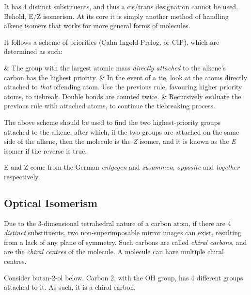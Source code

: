 
			It has 4 distinct substituents, and thus a cis/trans designation cannot be used. Behold, E/Z isomerism. At its core it
			is simply another method of handling alkene isomers that works for more general forms of molecules.

			It follows a scheme of priorities (Cahn-Ingold-Prelog, or CIP), which are determined as such:
			\begin{romanlist}
				& The group with the largest atomic mass \textit{directly attached} to the alkene's carbon has the highest priority.
				& In the event of a tie, look at the atoms directly attached to \textit{that} offending atom. Use the previous
				  rule, favouring higher priority atoms, to tiebreak. Double bonds are counted twice.
				& Recursively evaluate the previous rule with attached atoms, to continue the tiebreaking process.
			\end{romanlist}

			The above scheme should be used to find the two highest-priority groups attached to the alkene, after which, if the two
			groups are attached on the same side of the alkene, then the molecule is the \textit{Z} isomer, and it is known as the
			\textit{E} isomer if the reverse is true.

			E and Z come from the German \textit{entgegen} and \textit{zusammen}, \textit{opposite} and \textit{together}
			respectively.



		\pagebreak
		\subsection{Optical Isomerism}

			Due to the 3-dimensional tetrahedral nature of a carbon atom, if there are 4 \textit{distinct} substituents, two
			non-superimposable mirror images can exist, resulting from a lack of any plane of symmetry. Such carbons are called
			\textit{chiral carbons}, and are the \textit{chiral centres} of the molecule. A molecule can have multiple chiral
			centres.

			Consider butan-2-ol below. Carbon 2, with the OH group, has 4 different groups attached to it. As such, it is a chiral carbon.

